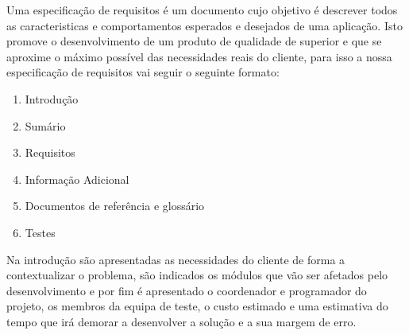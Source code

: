 \documentclass[sigplan]{acmart}
\begin{document}
Uma especificação de requisitos é um documento cujo objetivo é descrever todos as caracteristicas e comportamentos esperados e desejados de uma aplicação\cite{SRS}. Isto promove o desenvolvimento de um produto de qualidade de superior e que se aproxime o máximo possível das necessidades reais do cliente, para isso a nossa especificação de requisitos vai seguir o seguinte formato:
\begin{enumerate}
  \item Introdução
  \item Sumário
  \item Requisitos
  \item Informação Adicional
  \item Documentos de referência e glossário
  \item Testes
\end{enumerate}
Na introdução são apresentadas as necessidades do cliente de forma a contextualizar o problema, são indicados os módulos que vão ser afetados pelo desenvolvimento e por fim é apresentado o coordenador e programador do projeto, os membros da equipa de teste, o custo estimado e uma estimativa do tempo que irá demorar a desenvolver a solução e a sua margem de erro.
\end{document}
